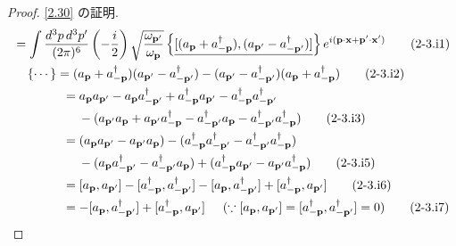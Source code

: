 \documentclass[a4paper,12pt]{article}
\begin{document}
\color{blue}
\begin{proof}
\eqref{2.30} の証明.
\begin{align*}
    [\phi(\mathbf{x}), \pi(\mathbf{x}')] &= \int \frac{d^3p\, d^3p'}{(2\pi)^6} \left( -\frac{i}{2} \right) \sqrt{\frac{\omega_{\mathbf{p}'}}{\omega_{\mathbf{p}}}}
\left\{ \underline{[(a_{\mathbf{p}} + a^\dagger_{-\mathbf{p}}), (a_{\mathbf{p}'} - a^\dagger_{-\mathbf{p}'})]} \right\}
e^{i(\mathbf{p}\cdot\mathbf{x} + \mathbf{p}'\cdot\mathbf{x}')} \tag{2-3.i1}\\
&\quad  \left\{ \cdots \right\} = (a_{\mathbf{p}} + a^\dagger_{-\mathbf{p}})(a_{\mathbf{p}'} - a^\dagger_{-\mathbf{p}'}) - (a_{\mathbf{p}'} - a^\dagger_{-\mathbf{p}'})(a_{\mathbf{p}} + a^\dagger_{-\mathbf{p}}) \tag{2-3.i2}\\
&\quad \hspace{1.05cm} = a_{\mathbf{p}} a_{\mathbf{p}'} - a_{\mathbf{p}} a^\dagger_{-\mathbf{p}'} + a^\dagger_{-\mathbf{p}} a_{\mathbf{p}'} - a^\dagger_{-\mathbf{p}} a^\dagger_{-\mathbf{p}'} \notag\\
&\quad \hspace{1.5cm} - (a_{\mathbf{p}'} a_{\mathbf{p}} + a_{\mathbf{p}'} a^\dagger_{-\mathbf{p}} - a^\dagger_{-\mathbf{p}'} a_{\mathbf{p}} - a^\dagger_{-\mathbf{p}'} a^\dagger_{-\mathbf{p}}) \tag{2-3.i3}\\
&\quad \hspace{1.05cm} = (a_{\mathbf{p}} a_{\mathbf{p}'} - a_{\mathbf{p}'} a_{\mathbf{p}}) - (a^\dagger_{-\mathbf{p}} a^\dagger_{-\mathbf{p}'} - a^\dagger_{-\mathbf{p}'} a^\dagger_{-\mathbf{p}}) \notag\\
&\quad \hspace{1.5cm} - (a_{\mathbf{p}} a^\dagger_{-\mathbf{p}'} - a^\dagger_{-\mathbf{p}'} a_{\mathbf{p}}) + (a^\dagger_{-\mathbf{p}} a_{\mathbf{p}'} - a_{\mathbf{p}'} a^\dagger_{-\mathbf{p}}) \tag{2-3.i5}\\
&\quad \hspace{1.05cm} = [a_{\mathbf{p}}, a_{\mathbf{p}'}] - [a^\dagger_{-\mathbf{p}}, a^\dagger_{-\mathbf{p}'}] - [a_{\mathbf{p}}, a^\dagger_{-\mathbf{p}'}] + [a^\dagger_{-\mathbf{p}}, a_{\mathbf{p}'}] \tag{2-3.i6}\\
&\quad \hspace{1.05cm} = - [a_{\mathbf{p}}, a^\dagger_{-\mathbf{p}'}] + [a^\dagger_{-\mathbf{p}}, a_{\mathbf{p}'}] \hspace{0.5cm} (\because [a_{\mathbf{p}}, a_{\mathbf{p}'}] = [a^\dagger_{-\mathbf{p}}, a^\dagger_{-\mathbf{p}'}] = 0) \tag{2-3.i7}\\

\end{align*}
\end{proof}
\end{document}
